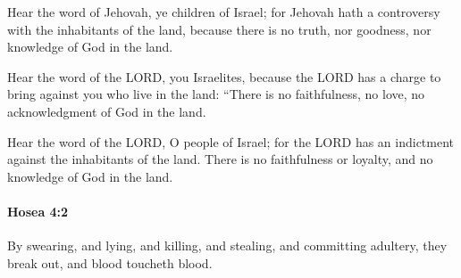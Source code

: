 			\begin{versebox}
					\item[BHS] 
					\item[LXX] 
					\item[ASV] Hear the word of Jehovah, ye children of Israel; for Jehovah hath a controversy with the inhabitants of the land, because there is no truth, nor goodness, nor knowledge of God in the land.
					\item[NIV] Hear the word of the LORD, you Israelites, because the LORD has a charge to bring against you who live in the land: “There is no faithfulness, no love, no acknowledgment of God in the land.
					\item[NRSV] Hear the word of the LORD, O people of Israel; for the LORD has an indictment against the inhabitants of the land. There is no faithfulness or loyalty, and no knowledge of God in the land.
			\end{versebox}

		\paragraph{Hosea 4:2} %
			\label{HOSEA-4-2}

			By swearing, and lying, and killing, and stealing, and committing adultery, they break out, and blood toucheth blood.

